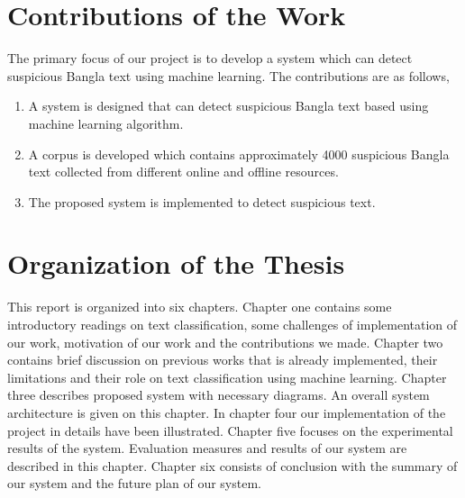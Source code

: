 \section{Contributions of the Work}
The primary focus of our project is to develop a system which can detect suspicious Bangla text using machine learning. The contributions are as follows,
\begin{enumerate}
    \item A system is designed that can detect suspicious Bangla text based using machine learning algorithm.
    
    \item A corpus is developed which contains approximately 4000 suspicious Bangla text collected from different online and offline resources.
    
    \item The proposed system is implemented to detect suspicious text.
\end{enumerate}

\section{Organization of the Thesis}
This report is organized into six chapters. Chapter one contains some introductory readings
on text classification, some challenges of implementation of our work, motivation of our work and the contributions we made. Chapter two contains brief discussion on previous works that is already implemented, their limitations and their role on text classification using machine learning. Chapter three describes proposed system with necessary diagrams. An overall system architecture is given on this chapter. In chapter four our implementation of the project in details have been illustrated. Chapter five focuses on the experimental results of the system. Evaluation measures and results of our system are described in this chapter. Chapter six consists of conclusion with the summary of our system and
the future plan of our system. 
\clearpage